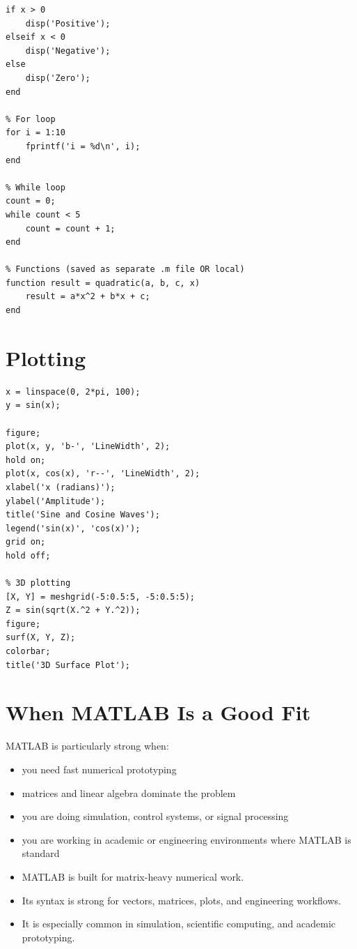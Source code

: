 \documentclass[12pt, a4paper, oneside]{book}
\begin{document}
\begin{lstlisting}[caption={MATLAB control flow}]
% If-else
if x > 0
    disp('Positive');
elseif x < 0
    disp('Negative');
else
    disp('Zero');
end

% For loop
for i = 1:10
    fprintf('i = %d\n', i);
end

% While loop
count = 0;
while count < 5
    count = count + 1;
end

% Functions (saved as separate .m file OR local)
function result = quadratic(a, b, c, x)
    result = a*x^2 + b*x + c;
end
\end{lstlisting}

\section{Plotting}

\begin{lstlisting}[caption={MATLAB plotting}]
x = linspace(0, 2*pi, 100);
y = sin(x);

figure;
plot(x, y, 'b-', 'LineWidth', 2);
hold on;
plot(x, cos(x), 'r--', 'LineWidth', 2);
xlabel('x (radians)');
ylabel('Amplitude');
title('Sine and Cosine Waves');
legend('sin(x)', 'cos(x)');
grid on;
hold off;

% 3D plotting
[X, Y] = meshgrid(-5:0.5:5, -5:0.5:5);
Z = sin(sqrt(X.^2 + Y.^2));
figure;
surf(X, Y, Z);
colorbar;
title('3D Surface Plot');
\end{lstlisting}

\section{When MATLAB Is a Good Fit}

MATLAB is particularly strong when:
\begin{itemize}[leftmargin=2em]
    \item you need fast numerical prototyping
    \item matrices and linear algebra dominate the problem
    \item you are doing simulation, control systems, or signal processing
    \item you are working in academic or engineering environments where MATLAB is standard
\end{itemize}

\begin{summarybox}
\begin{itemize}[leftmargin=2em]
    \item MATLAB is built for matrix-heavy numerical work.
    \item Its syntax is strong for vectors, matrices, plots, and engineering workflows.
    \item It is especially common in simulation, scientific computing, and academic prototyping.
\end{itemize}
\end{summarybox}
\end{document}
